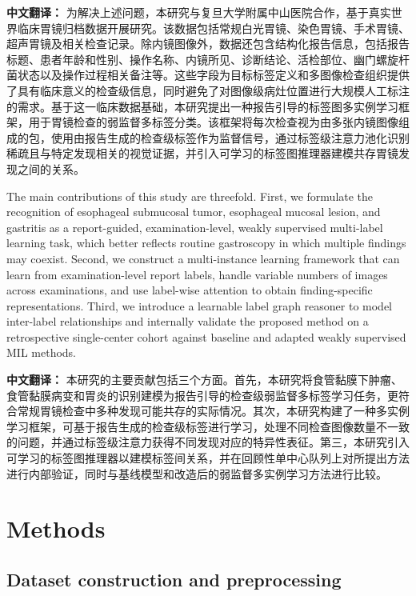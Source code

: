 \documentclass[Afour,sagev,times]{sagej}
\begin{document}
\textbf{中文翻译：} 为解决上述问题，本研究与复旦大学附属中山医院合作，基于真实世界临床胃镜归档数据开展研究。该数据包括常规白光胃镜、染色胃镜、手术胃镜、超声胃镜及相关检查记录。除内镜图像外，数据还包含结构化报告信息，包括报告标题、患者年龄和性别、操作名称、内镜所见、诊断结论、活检部位、幽门螺旋杆菌状态以及操作过程相关备注等。这些字段为目标标签定义和多图像检查组织提供了具有临床意义的检查级信息，同时避免了对图像级病灶位置进行大规模人工标注的需求。基于这一临床数据基础，本研究提出一种报告引导的标签图多实例学习框架，用于胃镜检查的弱监督多标签分类。该框架将每次检查视为由多张内镜图像组成的包，使用由报告生成的检查级标签作为监督信号，通过标签级注意力池化识别稀疏且与特定发现相关的视觉证据，并引入可学习的标签图推理器建模共存胃镜发现之间的关系。

The main contributions of this study are threefold. First, we formulate the recognition of esophageal submucosal tumor, esophageal mucosal lesion, and gastritis as a report-guided, examination-level, weakly supervised multi-label learning task, which better reflects routine gastroscopy in which multiple findings may coexist. Second, we construct a multi-instance learning framework that can learn from examination-level report labels, handle variable numbers of images across examinations, and use label-wise attention to obtain finding-specific representations. Third, we introduce a learnable label graph reasoner to model inter-label relationships and internally validate the proposed method on a retrospective single-center cohort against baseline and adapted weakly supervised MIL methods.

\textbf{中文翻译：} 本研究的主要贡献包括三个方面。首先，本研究将食管黏膜下肿瘤、食管黏膜病变和胃炎的识别建模为报告引导的检查级弱监督多标签学习任务，更符合常规胃镜检查中多种发现可能共存的实际情况。其次，本研究构建了一种多实例学习框架，可基于报告生成的检查级标签进行学习，处理不同检查图像数量不一致的问题，并通过标签级注意力获得不同发现对应的特异性表征。第三，本研究引入可学习的标签图推理器以建模标签间关系，并在回顾性单中心队列上对所提出方法进行内部验证，同时与基线模型和改造后的弱监督多实例学习方法进行比较。

\section{Methods}
\subsection{Dataset construction and preprocessing}
\end{document}

